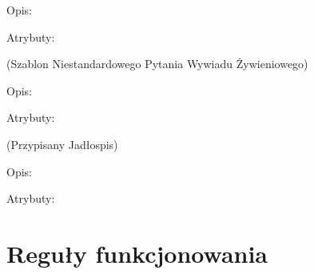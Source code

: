 \begin{enumerate}[label={\textbf{KAT/\protect\threedigits{\theenumi}}}, wide, labelwidth=!, labelindent=0pt, labelsep=0pt, series=reqs]
    Opis: \lipsum[1]
    \par
    Atrybuty:
    \begin{itemize}[series=atr]
         \label{kat:CustomNutritionalInterviewQuestion:id}
         \label{kat:CustomNutritionalInterviewQuestion:ordinalNumber}
         \label{kat:CustomNutritionalInterviewQuestion:question}
         \label{kat:CustomNutritionalInterviewQuestion:answer}
    \end{itemize}

     \label{kat:CustomNutritionalInterviewQuestionTemplate} (Szablon Niestandardowego Pytania Wywiadu Żywieniowego)

    Opis: \lipsum[1]
    \par
    Atrybuty:
    \begin{itemize}[series=atr]
         \label{kat:CustomNutritionalInterviewQuestionTemplate:id}
         \label{kat:CustomNutritionalInterviewQuestionTemplate:question}
         \label{kat:CustomNutritionalInterviewQuestionTemplate:language}
    \end{itemize}

     \label{kat:AssignedMealPlan} (Przypisany Jadłospis)

    Opis: \lipsum[1]
    \par
    Atrybuty:
    \begin{itemize}[series=atr]
         \label{kat:AssignedMealPlan:id}
         \label{kat:AssignedMealPlan:assigmentTime}
    \end{itemize}

\end{enumerate}

\section {Reguły funkcjonowania}

